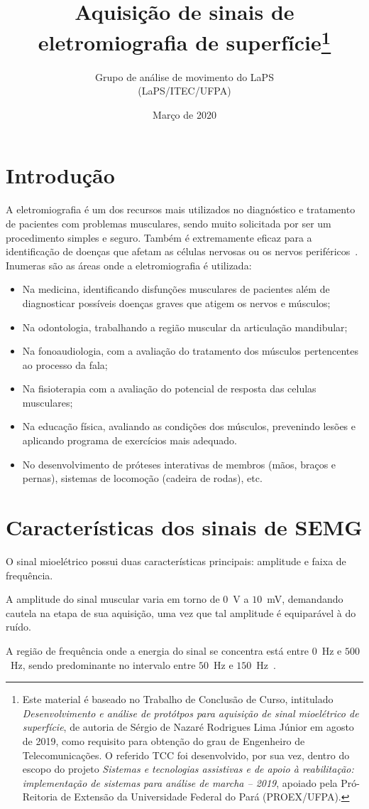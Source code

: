 \documentclass[a4paper,11pt]{article}
\title{Aquisição de sinais de eletromiografia de superfície\footnote{Este material é baseado no Trabalho de Conclusão de Curso, intitulado \emph{Desenvolvimento e análise de protótpos para aquisição de sinal mioelétrico de superfície}, de autoria de Sérgio de Nazaré Rodrigues Lima Júnior em agosto de 2019, como requisito para obtenção do grau de Engenheiro de Telecomunicações. O referido TCC foi desenvolvido, por sua vez, dentro do escopo do projeto \emph{Sistemas e tecnologias assistivas e de apoio à reabilitação: implementação de sistemas para análise de marcha -- 2019}, apoiado pela Pró-Reitoria de Extensão da Universidade Federal do Pará (PROEX/UFPA).}}
\author{Grupo de análise de movimento do LaPS\\
        (LaPS/ITEC/UFPA)}
\date{Março de 2020}
\begin{document}
\maketitle

\section{Introdução}
\label{sec:intro}
A eletromiografia é um dos recursos mais utilizados no diagnóstico e tratamento de pacientes com problemas musculares, sendo muito solicitada por ser um procedimento simples e seguro. Também é extremamente eficaz para a identificação de doenças que afetam as células nervosas ou os nervos periféricos~\parencite{MIOTEC2019}. Inumeras são as áreas onde a eletromiografia é utilizada:
\begin{itemize}
   \item Na medicina, identificando disfunções musculares de pacientes além de diagnosticar possíveis doenças graves que atigem os nervos e músculos;
   \item Na odontologia, trabalhando a região muscular da articulação mandibular;
   \item Na fonoaudiologia, com a avaliação do tratamento dos músculos pertencentes ao processo da fala;
   \item Na fisioterapia com a avaliação do potencial de resposta das celulas musculares;
   \item Na educação física, avaliando as condições dos músculos, prevenindo lesões e aplicando programa de exercícios mais adequado.
   \item No desenvolvimento de próteses interativas de membros (mãos, braços e pernas), sistemas de locomoção (cadeira de rodas), etc.
\end{itemize}

\section{Características dos sinais de SEMG}
\label{sec:carac}
O sinal mioelétrico possui duas características principais: amplitude e faixa de frequência.

A amplitude do sinal muscular varia em torno de $0$~V a $10$~mV, demandando cautela na etapa de sua aquisição, uma vez que tal amplitude é equiparável à do ruído. %

A região de frequência onde a energia do sinal se concentra está entre $0$~Hz e $500$~Hz, sendo predominante no intervalo entre $50$~Hz e $150$~Hz~\parencite{DELUCA2002}.
\end{document}
